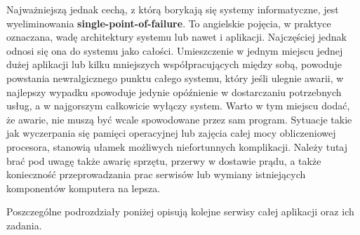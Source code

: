 Najważniejszą jednak cechą, z którą borykają się systemy informatyczne, jest wyeliminowania \textbf{single-point-of-failure}.
To angielskie pojęcia, w praktyce oznaczana, wadę architektury systemu lub nawet i aplikacji. Najczęściej jednak odnosi się
ona do systemu jako całości. Umieszczenie w jednym miejscu jednej dużej aplikacji lub kilku mniejszych współpracujących 
między sobą, powoduje powstania newralgicznego punktu całego systemu, który jeśli ulegnie awarii, w najlepszy wypadku spowoduje
jedynie opóźnienie w dostarczaniu potrzebnych usług, a w najgorszym całkowicie wyłączy system. Warto w tym miejscu dodać, że
awarie, nie muszą być wcale spowodowane przez sam program. Sytuacje takie jak wyczerpania się pamięci operacyjnej lub 
zajęcia całej mocy obliczeniowej procesora, stanowią ułamek możliwych niefortunnych komplikacji. Należy tutaj brać pod uwagę
także awarię sprzętu, przerwy w dostawie prądu, a także konieczność przeprowadzania prac serwisów lub wymiany istniejących
komponentów komputera na lepsza.  

Poszczególne podrozdziały poniżej opisują kolejne serwisy całej aplikacji oraz ich zadania.
